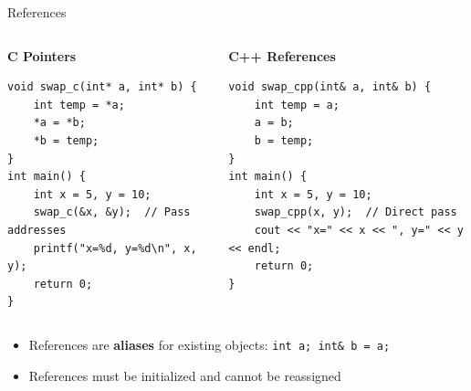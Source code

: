 \begin{frame}[fragile]{References}
	\begin{columns}
		\begin{column}{0.5\textwidth}
			\textbf{C Pointers}
			\begin{verbatim}
void swap_c(int* a, int* b) {
    int temp = *a;
    *a = *b;
    *b = temp;
}
int main() {
    int x = 5, y = 10;
    swap_c(&x, &y);  // Pass addresses
    printf("x=%d, y=%d\n", x, y);
    return 0;
}
			\end{verbatim}
		\end{column}
		\begin{column}{0.5\textwidth}
			\textbf{C++ References}
			\begin{verbatim}
void swap_cpp(int& a, int& b) {
    int temp = a;
    a = b;
    b = temp;
}
int main() {
    int x = 5, y = 10;
    swap_cpp(x, y);  // Direct pass
    cout << "x=" << x << ", y=" << y << endl;
    return 0;
}
			\end{verbatim}
		\end{column}
	\end{columns}

	\vspace{0.5em}
	\begin{itemize}
		\item References are \textbf{aliases} for existing objects: \texttt{int a; int\& b = a;}
		\item References must be initialized and cannot be reassigned
	\end{itemize}
\end{frame}

